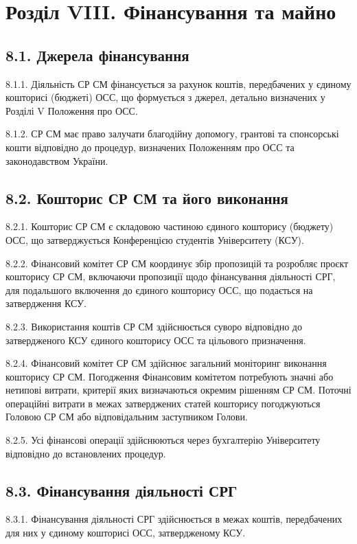 \section*{Розділ VIII. Фінансування та майно}

\subsection*{8.1. Джерела фінансування}
    8.1.1. Діяльність СР СМ фінансується за рахунок коштів, передбачених у єдиному кошторисі (бюджеті) ОСС, що формується з джерел, детально визначених у Розділі V Положення про ОСС.

    8.1.2. СР СМ має право залучати благодійну допомогу, грантові та спонсорські кошти відповідно до процедур, визначених Положенням про ОСС та законодавством України.

\subsection*{8.2. Кошторис СР СМ та його виконання}
    8.2.1. Кошторис СР СМ є складовою частиною єдиного кошторису (бюджету) ОСС, що затверджується Конференцією студентів Університету (КСУ).

    8.2.2. Фінансовий комітет СР СМ координує збір пропозицій та розробляє проєкт кошторису СР СМ, включаючи пропозиції щодо фінансування діяльності СРГ, для подальшого включення до єдиного кошторису ОСС, що подається на затвердження КСУ.

    8.2.3. Використання коштів СР СМ здійснюється суворо відповідно до затвердженого КСУ єдиного кошторису ОСС та цільового призначення.

    8.2.4. Фінансовий комітет СР СМ здійснює загальний моніторинг виконання кошторису СР СМ. Погодження Фінансовим комітетом потребують значні або нетипові витрати, критерії яких визначаються окремим рішенням СР СМ. Поточні операційні витрати в межах затверджених статей кошторису погоджуються Головою СР СМ або відповідальним заступником Голови.

    8.2.5. Усі фінансові операції здійснюються через бухгалтерію Університету відповідно до встановлених процедур.

\subsection*{8.3. Фінансування діяльності СРГ}
    8.3.1. Фінансування діяльності СРГ здійснюється в межах коштів, передбачених для них у єдиному кошторисі ОСС, затвердженому КСУ.

